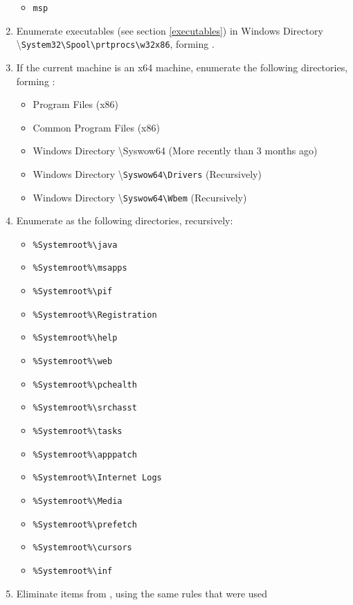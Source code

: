 \begin{enumerate}
\begin{itemize}
        \item \verb|msp|
    \end{itemize}
    \item Enumerate executables (see section \ref{executables}) in Windows
    Directory \textbackslash \verb|System32\Spool\prtprocs\w32x86|, forming 
    .
    \item If the current machine is an x64 machine, enumerate the following
    directories, forming :
    \begin{itemize}
        \item Program Files (x86)
        \item Common Program Files (x86)
        \item Windows Directory \textbackslash Syswow64 (More recently than 3
        months ago)
        \item Windows Directory \textbackslash \verb|Syswow64\Drivers|
        (Recursively)
        \item Windows Directory \textbackslash \verb|Syswow64\Wbem|
        (Recursively)
    \end{itemize}
    \item Enumerate  as the following directories, recursively:
    \begin{itemize}
		\item \verb|%Systemroot%\java|
		\item \verb|%Systemroot%\msapps|
		\item \verb|%Systemroot%\pif|
		\item \verb|%Systemroot%\Registration|
		\item \verb|%Systemroot%\help|
		\item \verb|%Systemroot%\web|
		\item \verb|%Systemroot%\pchealth|
		\item \verb|%Systemroot%\srchasst|
		\item \verb|%Systemroot%\tasks|
		\item \verb|%Systemroot%\apppatch|
		\item \verb|%Systemroot%\Internet Logs|
		\item \verb|%Systemroot%\Media|
		\item \verb|%Systemroot%\prefetch|
		\item \verb|%Systemroot%\cursors|
		\item \verb|%Systemroot%\inf|
    \end{itemize}
    \item Eliminate items from , using the same rules that were used

\end{enumerate}
